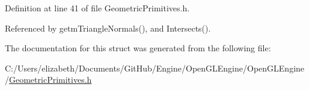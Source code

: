 Definition at line 41 of file Geometric\+Primitives.\+h.



Referenced by getm\+Triangle\+Normals(), and Intersects().



The documentation for this struct was generated from the following file\+:\begin{DoxyCompactItemize}
\item 
C\+:/\+Users/elizabeth/\+Documents/\+Git\+Hub/\+Engine/\+Open\+G\+L\+Engine/\+Open\+G\+L\+Engine/\hyperlink{_geometric_primitives_8h}{Geometric\+Primitives.\+h}\end{DoxyCompactItemize}
